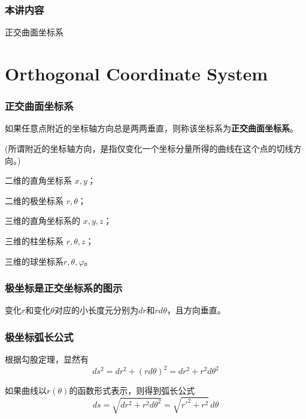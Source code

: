 \documentclass[CJK]{beamer}
\date{}
\begin{document}
  \bch
  

\begin{frame}
\frametitle{本讲内容}

\bitem
\item{正交曲面坐标系}
\eitem

\end{frame}


\section{Orthogonal Coordinate System}



\begin{frame}
\frametitle{正交曲面坐标系}

如果任意点附近的坐标轴方向总是两两垂直，则称该坐标系为{\blue \bf 正交曲面坐标系}。

\skiplines
(所谓附近的坐标轴方向，是指仅变化一个坐标分量所得的曲线在这个点的切线方向。)

\skiplines
\bex
二维的直角坐标系 $x, y$；

二维的极坐标系 $r, \theta$；

三维的直角坐标系的 $x, y, z$；

三维的柱坐标系 $r, \theta, z$；

三维的球坐标系$ r, \theta, \varphi$。
\eex

\end{frame}


\begin{frame}
\frametitle{极坐标是正交坐标系的图示}


变化$r$和变化$\theta$对应的小长度元分别为$dr$和$rd\theta$，且方向垂直。

\end{frame}


\begin{frame}
\frametitle{极坐标弧长公式}

根据勾股定理，显然有
$$ds^2 = dr^2 + (rd\theta)^2  = dr^2 + r^2 d\theta^2$$
\emini
{}
\emini

如果曲线以$r(\theta)$的函数形式表示，则得到弧长公式
$$ ds = \sqrt{dr^2+r^2d\theta^2} = \sqrt{r'^2+r^2 }\,d\theta$$


\end{frame}
\end{document}
